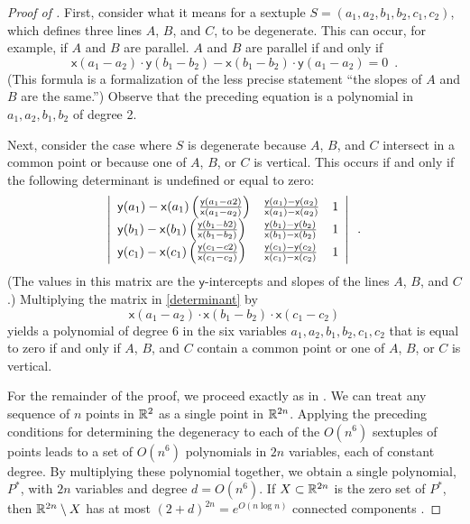 \documentclass{patmorin}
\newcommand{\x}{\mathsf{x}}
\newcommand{\y}{\mathsf{y}}
\begin{document}
\begin{proof}[Proof of ]
   First, consider what it means for a sextuple
   $S=(a_1,a_2,b_1,b_2,c_1,c_2)$, which defines three lines $A$, $B$,
   and $C$, to be degenerate.  This can occur, for example, if $A$
   and $B$ are parallel.  $A$ and $B$ are parallel if and only if
   \[
      \x(a_1-a_2)\cdot \y(b_1-b_2) - 
       \x(b_1-b_2)\cdot \y(a_1-a_2) = 0 \enspace .
   \]
   (This formula is a formalization of the less precise statement
   ``the slopes of $A$ and $B$ are the same.'')
   Observe that the preceding equation is a polynomial in
   $a_1,a_2,b_1,b_2$ of degree 2.

   Next, consider the case where $S$ is degenerate because $A$, $B$, and
   $C$ intersect in a common point or because one of $A$, $B$, or $C$
   is vertical.  This occurs if and only if the following determinant
   is undefined or equal to zero:
   \begin{equation}
   \left|\begin{array}{lll}
   \y(a_1)-\x(a_1)\left(\frac{\y(a_1-a2)}{\x(a_1-a_2)}\right) & \frac{\y(a_1)-\y(a_2)}{\x(a_1)-\x(a_2)} & 1 \\
   \y(b_1)-\x(b_1)\left(\frac{\y(b_1-b2)}{\x(b_1-b_2)}\right) & \frac{\y(b_1)-\y(b_2)}{\x(b_1)-\x(b_2)}  & 1 \\
   \y(c_1)-\x(c_1)\left(\frac{\y(c_1-c2)}{\x(c_1-c_2)}\right) & \frac{\y(c_1)-\y(c_2)}{\x(c_1)-\x(c_2)}  & 1 \\
   \end{array}\right| \enspace .
   \eqlabel{determinant}
   \end{equation}
   (The values in this matrix are the $\y$-intercepts and slopes of the
   lines $A$, $B$, and $C$.)
   Multiplying the matrix in \eqref{determinant} by 
   \[
      \x(a_1-a_2)\cdot
      \x(b_1-b_2)\cdot
      \x(c_1-c_2)
   \]
   yields a polynomial of degree $6$ in the six variables
   $a_1,a_2,b_1,b_2,c_1,c_2$ that is equal to zero if and only if $A$,
   $B$, and $C$ contain a common point or one of $A$, $B$, or $C$
   is vertical.

   For the remainder of the proof, we proceed exactly as in
   \cite{goodman.pollack:upper}.  We can treat any sequence of $n$ points
   in $\mathbb{R}^2$ as a single point in $\mathbb{R}^{2n}$.  Applying the preceding
   conditions for determining the degeneracy to each of the $O(n^6)$
   sextuples of points leads to a set of $O(n^6)$ polynomials in $2n$
   variables, each of constant degree.  By multiplying these polynomial
   together, we obtain a single polynomial, $P^*$, with $2n$ variables
   and degree $d=O(n^6)$.  If $X\subset\mathbb{R}^{2n}$ is the zero set of $P^*$,
   then $\mathbb{R}^{2n}\setminus X$ has at most $(2+d)^{2n}=e^{O(n\log n)}$
   connected components \cite[Lemma~2]{goodman.pollack:upper}.


\end{proof}
\end{document}
